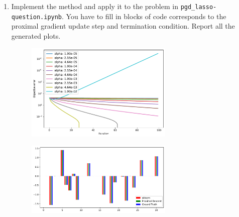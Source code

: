 \documentclass[12pt,twoside]{article}
\begin{document}
\begin{enumerate}
\begin{enumerate}
 \item Implement the method and apply it to the problem in \texttt{pgd\_lasso-question.ipynb}. You have to fill in blocks of code corresponds to the proximal gradient update step and termination condition. Report all the generated plots.\\
  
    	\begin{figure}[H]
		\centering
		\captionsetup{justification=centering}
		\includegraphics[width=200pt]{code/pgd/objective_error.pdf}
	\end{figure}

    	\begin{figure}[H]
		\centering
		\captionsetup{justification=centering}
		\includegraphics[width=200pt]{code/pgd/compare_models.pdf}
	\end{figure}

 \end{enumerate}
 

 \end{enumerate}
\end{document}
